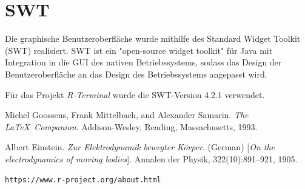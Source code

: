 \documentclass[a4paper, 12pt]{report} %
\begin{document}
\section{SWT}\label{swt} 
Die graphische Benutzeroberfläche wurde mithilfe des Standard Widget Toolkit (SWT) realisiert. SWT ist ein "open-source widget toolkit" für Java mit Integration in die GUI des nativen Betriebssystems, sodass das Design der Benutzeroberfläche an das Design des Betriebssystems angepasst wird. 

Für das Projekt \textit{R-Terminal} wurde die SWT-Version 4.2.1 verwendet.








%

%
\begin{thebibliography}{9} %
Michel Goossens, Frank Mittelbach, and Alexander Samarin. 
\textit{The \LaTeX\ Companion}. 
Addison-Wesley, Reading, Massachusetts, 1993.
 
Albert Einstein. 
\textit{Zur Elektrodynamik bewegter K{\"o}rper}. (German) 
[\textit{On the electrodynamics of moving bodies}]. 
Annalen der Physik, 322(10):891–921, 1905.

 
\texttt{https://www.r-project.org/about.html}
\end{thebibliography}
\end{document}
